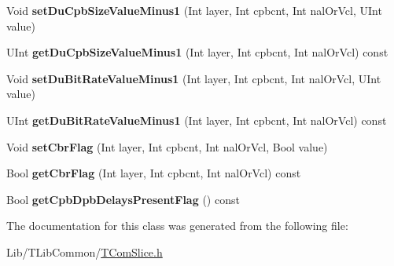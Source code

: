 \begin{DoxyCompactItemize}
\mbox{\label{class_t_com_h_r_d_ab19e8f81bbdf3792c387b02ea7ae8c23}} 
Void {\bfseries set\+Du\+Cpb\+Size\+Value\+Minus1} (Int layer, Int cpbcnt, Int nal\+Or\+Vcl, U\+Int value)
\item 
\mbox{\label{class_t_com_h_r_d_a63680f83f28f538f1c889c0e0a2cef3f}} 
U\+Int {\bfseries get\+Du\+Cpb\+Size\+Value\+Minus1} (Int layer, Int cpbcnt, Int nal\+Or\+Vcl) const
\item 
\mbox{\label{class_t_com_h_r_d_a4962e7995cf5d3c303d013c1ff8ec2a2}} 
Void {\bfseries set\+Du\+Bit\+Rate\+Value\+Minus1} (Int layer, Int cpbcnt, Int nal\+Or\+Vcl, U\+Int value)
\item 
\mbox{\label{class_t_com_h_r_d_a5285a75c7b849b54b794f78fb10084e5}} 
U\+Int {\bfseries get\+Du\+Bit\+Rate\+Value\+Minus1} (Int layer, Int cpbcnt, Int nal\+Or\+Vcl) const
\item 
\mbox{\label{class_t_com_h_r_d_a80bf013b2dff0449a4b1c48d9cbeac54}} 
Void {\bfseries set\+Cbr\+Flag} (Int layer, Int cpbcnt, Int nal\+Or\+Vcl, Bool value)
\item 
\mbox{\label{class_t_com_h_r_d_a5dc2d299f2dfebf2d8217dc24b8b8cab}} 
Bool {\bfseries get\+Cbr\+Flag} (Int layer, Int cpbcnt, Int nal\+Or\+Vcl) const
\item 
\mbox{\label{class_t_com_h_r_d_a7e7b76476ba563493474ffe86fa39a22}} 
Bool {\bfseries get\+Cpb\+Dpb\+Delays\+Present\+Flag} () const
\end{DoxyCompactItemize}


The documentation for this class was generated from the following file\+:\begin{DoxyCompactItemize}
\item 
Lib/\+T\+Lib\+Common/\hyperlink{_t_com_slice_8h}{T\+Com\+Slice.\+h}\end{DoxyCompactItemize}
